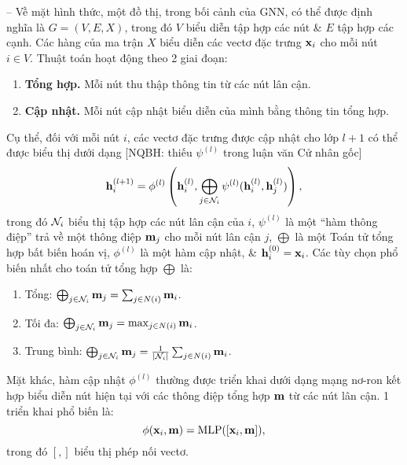 \documentclass{article}
\begin{document}
\begin{itemize}
\begin{itemize}
        -- Về mặt hình thức, một đồ thị, trong bối cảnh của GNN, có thể được định nghĩa là $G = (V,E,X)$, trong đó $V$ biểu diễn tập hợp các nút \& $E$ tập hợp các cạnh. Các hàng của ma trận $X$ biểu diễn các vectơ đặc trưng ${\bf x}_i$ cho mỗi nút $i\in V$. Thuật toán hoạt động theo 2 giai đoạn:

        \begin{enumerate}

            \item {\bf Tổng hợp.} Mỗi nút thu thập thông tin từ các nút lân cận.


            \item {\bf Cập nhật.} Mỗi nút cập nhật biểu diễn của mình bằng thông tin tổng hợp.

        \end{enumerate}
        Cụ thể, đối với mỗi nút $i$, các vectơ đặc trưng được cập nhật cho lớp $l + 1$ có thể được biểu thị dưới dạng [NQBH: thiếu $\psi^{(l)}$ trong luận văn Cử nhân gốc]
        \begin{equation*}
            {\bf h}_i^{(l + 1)} = \phi^{(l)}\left({\bf h}_i^{(l)},\bigoplus_{j\in{\cal N}_i} \psi^{(l)}({\bf h}_i^{(l)},{\bf h}_j^{(l)})\right),
        \end{equation*}
        trong đó ${\cal N}_i$ biểu thị tập hợp các nút lân cận của $i$, $\psi^{(l)}$ là một ``hàm thông điệp'' trả về một thông điệp ${\bf m}_j$ cho mỗi nút lân cận $j$, $\bigoplus$ là một Toán tử tổng hợp bất biến hoán vị, $\phi^{(l)}$ là một hàm cập nhật, \& ${\bf h}_i^{(0)} = {\bf x}_i$. Các tùy chọn phổ biến nhất cho toán tử tổng hợp $\bigoplus$ là:
        \begin{enumerate}
            \item Tổng: $\bigoplus_{j\in{\cal N}_i} {\bf m}_j = \sum_{j\in N(i)} {\bf m}_i$.
            \item Tối đa: $\bigoplus_{j\in{\cal N}_i} {\bf m}_j = \max_{j\in N(i)} {\bf m}_i$.
            \item Trung bình: $\bigoplus_{j\in{\cal N}_i} {\bf m}_j = \frac{1}{|{\cal N}_i|}\sum_{j\in N(i)} {\bf m}_i$.
        \end{enumerate}
        Mặt khác, hàm cập nhật $\phi^{(l)}$ thường được triển khai dưới dạng mạng nơ-ron kết hợp biểu diễn nút hiện tại với các thông điệp tổng hợp ${\bf m}$ từ các nút lân cận. 1 triển khai phổ biến là:
        \begin{equation*}
            \phi({\bf x}_i,{\bf m}) = {\rm MLP}([{\bf x}_i,{\bf m}]),
        \end{equation*}
        trong đó $[,]$ biểu thị phép nối vectơ.


\end{itemize}
\end{itemize}
\end{document}
